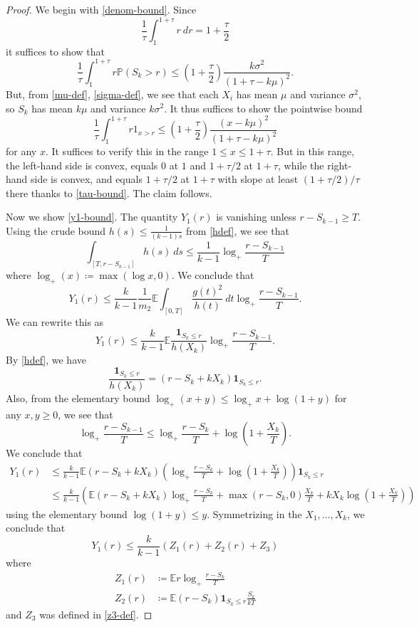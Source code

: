 \documentclass{bmcart}
\theoremstyle{plain}
\theoremstyle{definition}
\newcommand\E{\mathbb{E}}
\renewcommand\P{\mathbb{P}}
\newcommand{\onef}{\mathbf{1}}
\begin{document}
\begin{proof}
We begin with \eqref{denom-bound}.  Since
$$ \frac{1}{\tau} \int_1^{1+\tau} r\ dr = 1+\frac{\tau}{2}$$
it suffices to show that
$$
\frac{1}{\tau} \int_1^{1+\tau} r \P( S_k > r) \leq (1+\frac{\tau}{2}) \frac{k\sigma^2}{(1+\tau-k\mu)^2}.
$$
But, from \eqref{mu-def}, \eqref{sigma-def}, we see that each $X_i$ has mean $\mu$ and variance $\sigma^2$, so $S_k$ has mean $k\mu$ and variance $k\sigma^2$.  It thus suffices to show the pointwise bound
$$
\frac{1}{\tau} \int_1^{1+\tau} r 1_{x>r} \leq (1+\frac{\tau}{2}) \frac{(x-k\mu)^2}{(1+\tau-k\mu)^2}
$$
for any $x$. It suffices to verify this in the range $1 \leq x \leq 1+\tau$.  But in this range, the left-hand side is convex, equals $0$ at $1$ and $1+\tau/2$ at $1+\tau$, while the right-hand side is convex, and equals $1+\tau/2$ at $1+\tau$ with slope at least $(1+\tau/2)/\tau$ there thanks to \eqref{tau-bound}.  The claim follows.

Now we show \eqref{y1-bound}.  The quantity $Y_1(r)$ is vanishing unless $r-S_{k-1} \geq T$.  Using the crude bound $h(s) \leq \frac{1}{(k-1)s}$ from \eqref{hdef}, we see that
$$ \int_{[T,r-S_{k-1}]} h(s)\ ds \leq \frac{1}{k-1} \log_+ \frac{r-S_{k-1}}{T}$$
where $\log_+(x) \coloneqq \max(\log x, 0)$.  We conclude that
$$ Y_1(r) \leq \frac{k}{k-1} \frac{1}{m_2} \E \int_{[0,T]} \frac{g(t)^2}{h(t)}\ dt \log_+ \frac{r-S_{k-1}}{T}.$$
We can rewrite this as
$$ Y_1(r) \leq \frac{k}{k-1} \E \frac{\onef_{S_k \leq r}}{h(X_k)} \log_+ \frac{r-S_{k-1}}{T}.$$
By \eqref{hdef}, we have
$$ \frac{\onef_{S_k \leq r}}{h(X_k)} = (r-S_k+kX_k) \onef_{S_k \leq r}.$$
Also, from the elementary bound $\log_+(x+y) \leq \log_+ x + \log(1+y)$ for any $x,y \geq 0$, we see that
$$ \log_+ \frac{r-S_{k-1}}{T} \leq \log_+ \frac{r-S_{k}}{T} + \log\left(1+\frac{X_k}{T}\right).$$
We conclude that
\begin{align*}
Y_1(r) &\leq \frac{k}{k-1} \E (r-S_k+kX_k) \left( \log_+ \frac{r-S_{k}}{T} + \log\left(1+\frac{X_k}{T}\right) \right) \onef_{S_k \leq r}\\
&\leq \frac{k}{k-1} \left( \E (r-S_k+kX_k) \log_+ \frac{r-S_{k}}{T} + \max(r-S_k,0) \frac{X_k}{T} + k X_k \log\left(1+\frac{X_k}{T}\right) \right)
\end{align*}
using the elementary bound $\log(1+y) \leq y$.  Symmetrizing in the $X_1,\dots,X_k$, we conclude that
\begin{equation}\label{y1r}
 Y_1(r) \leq \frac{k}{k-1} (Z_1(r) + Z_2(r) + Z_3)
\end{equation}
where
\begin{align*}
Z_1(r) &\coloneqq \E r \log_+ \frac{r-S_k}{T} \\
Z_2(r) &\coloneqq \E (r-S_k) \onef_{S_k \leq r} \frac{S_k}{kT} 
\end{align*}
and $Z_3$ was defined in \eqref{z3-def}.


\end{proof}
\end{document}
